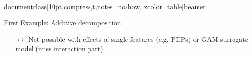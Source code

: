 \\documentclass[10pt,compress,t,notes=noshow, xcolor=table]{beamer}
\newcommand{\open}{}
\newcommand{\close}{}
\begin{document}
\begin{frame}{First Example: Additive decomposition}
\begin{example}
\begin{itemize}
        \pause
        \item[$\leftrightarrow$] Not possible with effects of single features (e.g. PDPs) or GAM surrogate model (miss interaction part)
    
        
        
    \end{itemize}

    \end{example}

\end{frame}




    
\end{document}
